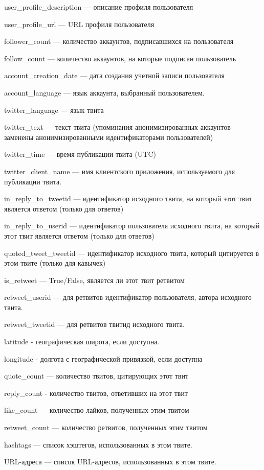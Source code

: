 user\_profile\_description — описание профиля пользователя

user\_profile\_url — URL профиля пользователя

follower\_count — количество аккаунтов, подписавшихся на пользователя

follow\_count — количество аккаунтов, на которые подписан пользователь

account\_creation\_date — дата создания учетной записи пользователя

account\_language — язык аккаунта, выбранный пользователем.

twitter\_language — язык твита

twitter\_text — текст твита (упоминания анонимизированных аккаунтов заменены анонимизированными идентификаторами пользователей)

twitter\_time — время публикации твита (UTC)

twitter\_client\_name — имя клиентского приложения, используемого для публикации твита.

in\_reply\_to\_tweetid — идентификатор исходного твита, на который этот твит является ответом (только для ответов)

in\_reply\_to\_userid — идентификатор пользователя исходного твита, на который этот твит является ответом (только для ответов)

quoted\_tweet\_tweetid — идентификатор исходного твита, который цитируется в этом твите (только для кавычек)

is\_retweet — True/False, является ли этот твит ретвитом

retweet\_userid — для ретвитов идентификатор пользователя, автора исходного твита.

retweet\_tweetid — для ретвитов твитид исходного твита.

latitude - географическая широта, если доступна.

longitude - долгота с географической привязкой, если доступна

quote\_count — количество твитов, цитирующих этот твит

reply\_count - количество твитов, ответивших на этот твит

like\_count — количество лайков, полученных этим твитом

retweet\_count — количество ретвитов, полученных этим твитом

hashtags — список хэштегов, использованных в этом твите.

URL-адреса — список URL-адресов, использованных в этом твите.

